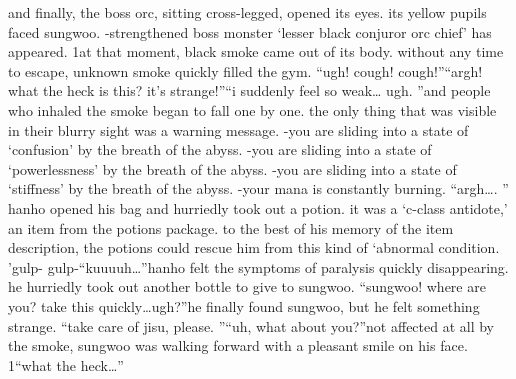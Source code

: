 and finally, the boss orc, sitting cross-legged, opened its eyes.
 its yellow pupils faced sungwoo.
-strengthened boss monster ‘lesser black conjuror orc chief’ has appeared.
1at that moment, black smoke came out of its body.
 without any time to escape, unknown smoke quickly filled the gym.
“ugh! cough! cough!”“argh! what the heck is this? it’s strange!”“i suddenly feel so weak… ugh.
”and people who inhaled the smoke began to fall one by one.
 the only thing that was visible in their blurry sight was a warning message.
-you are sliding into a state of ‘confusion’ by the breath of the abyss.
-you are sliding into a state of ‘powerlessness’ by the breath of the abyss.
-you are sliding into a state of ‘stiffness’ by the breath of the abyss.
-your mana is constantly burning.
“argh….
” hanho opened his bag and hurriedly took out a potion.
 it was a ‘c-class antidote,’ an item from the potions package.
 to the best of his memory of the item description, the potions could rescue him from this kind of ‘abnormal condition.
’gulp- gulp-“kuuuuh…”hanho felt the symptoms of paralysis quickly disappearing.
 he hurriedly took out another bottle to give to sungwoo.
“sungwoo! where are you? take this quickly…ugh?”he finally found sungwoo, but he felt something strange.
“take care of jisu, please.
”“uh, what about you?”not affected at all by the smoke, sungwoo was walking forward with a pleasant smile on his face.
1“what the heck…”

 